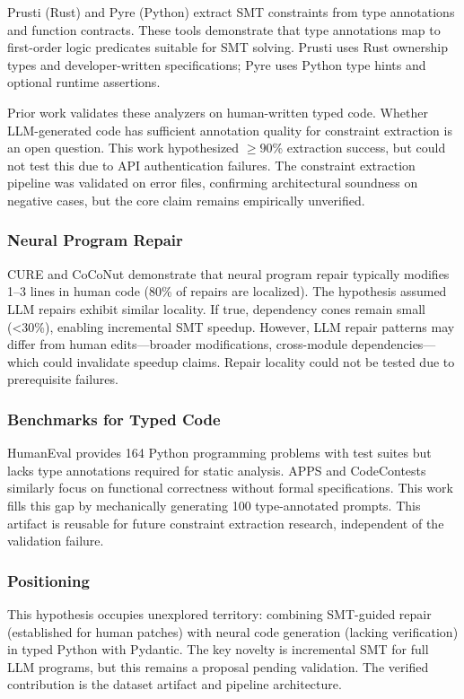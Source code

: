 Prusti (Rust) and Pyre (Python) extract SMT constraints from type annotations and function contracts. These tools demonstrate that type annotations map to first-order logic predicates suitable for SMT solving. Prusti uses Rust ownership types and developer-written specifications; Pyre uses Python type hints and optional runtime assertions.

Prior work validates these analyzers on human-written typed code. Whether LLM-generated code has sufficient annotation quality for constraint extraction is an open question. This work hypothesized $\geq 90$\% extraction success, but could not test this due to API authentication failures. The constraint extraction pipeline was validated on error files, confirming architectural soundness on negative cases, but the core claim remains empirically unverified.

\subsubsection{Neural Program Repair}

CURE and CoCoNut demonstrate that neural program repair typically modifies 1--3 lines in human code (80\% of repairs are localized). The hypothesis assumed LLM repairs exhibit similar locality. If true, dependency cones remain small (<30\%), enabling incremental SMT speedup. However, LLM repair patterns may differ from human edits---broader modifications, cross-module dependencies---which could invalidate speedup claims. Repair locality could not be tested due to prerequisite failures.

\subsubsection{Benchmarks for Typed Code}

HumanEval provides 164 Python programming problems with test suites but lacks type annotations required for static analysis. APPS and CodeContests similarly focus on functional correctness without formal specifications. This work fills this gap by mechanically generating 100 type-annotated prompts. This artifact is reusable for future constraint extraction research, independent of the validation failure.

\subsubsection{Positioning}

This hypothesis occupies unexplored territory: combining SMT-guided repair (established for human patches) with neural code generation (lacking verification) in typed Python with Pydantic. The key novelty is incremental SMT for full LLM programs, but this remains a proposal pending validation. The verified contribution is the dataset artifact and pipeline architecture.

